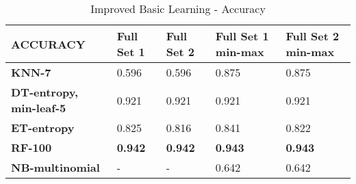 \documentclass[10pt, conference, compsocconf]{IEEEtran}
\begin{document}
\begin{center}
	\begin{table}[b]
		\centering \footnotesize
		\vspace{0.01cm}
		\caption{Improved Basic Learning - Accuracy}
		\hspace{1cm}
		\begin{tabularx}{\linewidth}{ l  X  X  X  X }
			\hline
			\textbf{ACCURACY} &	\textbf{Full Set 1}&	\textbf{Full Set 2}&	\textbf{Full Set 1 min-max}&	\textbf{Full Set 2 min-max} \\ \hline
			
			
			\textbf{KNN-7}&  0.596&	0.596&	0.875&	0.875 \\ \hline
			\textbf{DT-entropy, min-leaf-5}&  0.921&	0.921&	0.921&	0.921 \\ \hline
			\textbf{ET-entropy}&  0.825&	0.816&	0.841&	0.822 \\ \hline
			\textbf{RF-100}& \textbf{0.942}&	\textbf{0.942}&	\textbf{0.943}&	\textbf{0.943} \\ \hline
			\textbf{NB-multinomial}&  -	&-	&0.642&	0.642\\ \hline
			
			
		\end{tabularx}\newline
		\vspace{-0.05cm}
		\label{Table3}
	\end{table} \hfil
\end{center}
\end{document}
